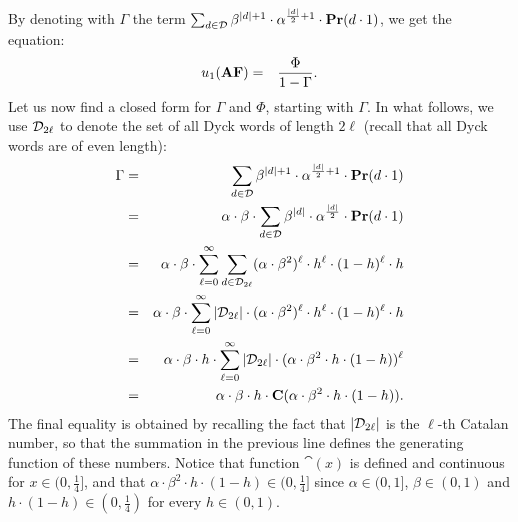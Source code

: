 %
By denoting with $\Gamma$ the term $\sum_{d\in \mathcal{D}} \beta^{|d|+1}\cdot  \alpha^{\frac{|d|}{2}+1}\cdot \mathbf{Pr}(d\cdot 1)$, we get the equation:
\begin{eqnarray*}
u_1(\text{\rm {\bf AF}}) & = &  \frac{\Phi}{1-\Gamma}.
\end{eqnarray*}
Let us now find a closed form for $\Gamma$ and $\Phi$, starting with $\Gamma$. In what follows, we use $\mathcal{D}_{2\ell}$ to denote the set of all Dyck words of length $2\ell$ (recall that all Dyck words are of even length):
%
\begin{eqnarray*}
\Gamma & = & \sum_{d\in \mathcal{D}} \beta^{|d|+1}\cdot  \alpha^{\frac{|d|}{2}+1}\cdot \mathbf{Pr}(d\cdot 1)\\
 & = & \alpha\cdot \beta \cdot \sum_{d\in \mathcal{D}} \beta^{|d|}\cdot  \alpha^{\frac{|d|}{2}}\cdot \mathbf{Pr}(d\cdot 1) \\
  & = & \alpha\cdot \beta \cdot \sum_{\ell = 0}^{\infty} \sum_{d\in \mathcal{D}_{2\ell}} (\alpha\cdot \beta^2)^{\ell}\cdot h^{\ell}\cdot (1-h)^{\ell}\cdot h\\
   & = &  \alpha\cdot \beta \cdot \sum_{\ell = 0}^{\infty} |\mathcal{D}_{2\ell}| \cdot (\alpha\cdot \beta^2)^{\ell}\cdot h^{\ell}\cdot (1-h)^{\ell}\cdot h\\
   & = &  \alpha\cdot \beta \cdot h \cdot \sum_{\ell = 0}^{\infty} |\mathcal{D}_{2\ell}| \cdot (\alpha\cdot \beta^2 \cdot h \cdot (1-h))^{\ell}\\
    & = &  \alpha\cdot \beta \cdot h \cdot \mathbf{C}(\alpha\cdot\beta^2 \cdot h \cdot (1-h)).
\end{eqnarray*}
%
The final equality is obtained by recalling the fact that $|\mathcal{D}_{2\ell}|$ is the $\ell$-th Catalan number, so that the summation in the previous line defines the generating function of these numbers. Notice that function $\cat(x)$ is defined and continuous for $x \in (0,\frac{1}{4}]$, and that $\alpha\cdot\beta^2 \cdot h \cdot (1-h) \in (0,\frac{1}{4}] $ since $\alpha \in (0,1]$, $\beta \in (0,1)$ and $h\cdot(1-h)\in (0,\frac{1}{4})$ for every $h\in(0,1)$.


